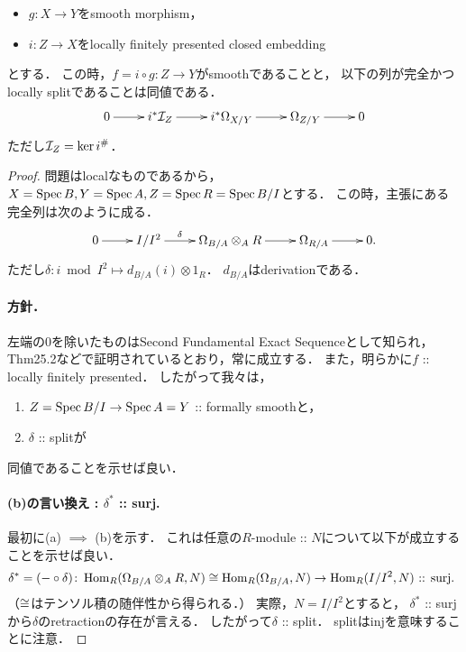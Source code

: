\documentclass[a4paper]{jsarticle}
\begin{document}
\begin{Prop} \hfill \vspace{-7mm}
    \begin{itemize}
        \item $g \colon X \to Y$をsmooth morphism，
        \item $i \colon Z \to X$をlocally finitely presented closed embedding
    \end{itemize}
    とする．
    この時，$f=i \circ g \colon Z \to Y$がsmoothであることと，
    以下の列が完全かつlocally splitであることは同値である．
    \[\xymatrix{
        0 \ar[r]& i^*\shI_Z \ar[r]& i^*\shDer_{X/Y} \ar[r]& \shDer_{Z/Y} \ar[r]& 0
    }\]
    ただし$\mathcal{I}_Z=\ker i^{\#}$．
\end{Prop}
\begin{proof}
    問題はlocalなものであるから，
    $X=\operatorname{Spec} B, Y=\operatorname{Spec} A, Z=\operatorname{Spec} R=\operatorname{Spec} B/I$とする．
    この時，主張にある完全列は次のように成る．
    \[\xymatrix{
            0 \ar[r]& I/I^2 \ar[r]^-{\delta}& \shDer_{B/A} \otimes_A R \ar[r]& \shDer_{R/A} \ar[r]& 0.
    }\]
    ただし$\delta \colon i \bmod I^2 \mapsto d_{B/A}(i) \otimes 1_R$．
    $d_{B/A}$はderivationである．

    \paragraph{方針．}
    左端の$0$を除いたものはSecond Fundamental Exact Sequenceとして知られ，
    \cite{Mat} Thm25.2などで証明されているとおり，常に成立する．
    また，明らかに$f$ :: locally finitely presented．
    したがって我々は，
    \begin{enumerate}[label=(\alph*), leftmargin=*]
        \item $Z=\operatorname{Spec} B/I \to \operatorname{Spec} A=Y$ :: formally smoothと，
        \item $\delta$ :: splitが
    \end{enumerate}
    同値であることを示せば良い．

    \paragraph{(b)の言い換え : $\delta^*$ :: surj.}
    最初に(a) $\implies$ (b)を示す．
    これは任意の$R$-module :: $N$について以下が成立することを示せば良い．
    \[
        \delta^*=(- \circ \delta) \colon
            \operatorname{Hom}_R(\Omega_{B/A} \otimes_A R, N) \cong \operatorname{Hom}_R(\Omega_{B/A}, N) \to \operatorname{Hom}_R(I/I^2, N)
            \text{ :: surj. }
    \]
    （$\cong$はテンソル積の随伴性から得られる．）
    実際，$N=I/I^2$とすると，
    $\delta^*$ :: surjから$\delta$のretractionの存在が言える．
    したがって$\delta$ :: split．
    splitはinjを意味することに注意．


\end{proof}
\end{document}

